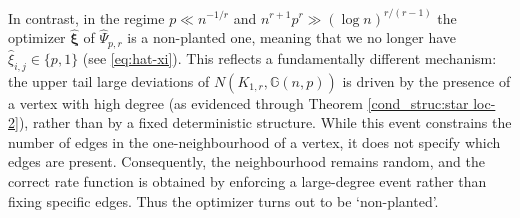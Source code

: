\documentclass[a4paper,11pt,english,reqno]{amsart}
\numberwithin{equation}{section}
\newcommand{\uH}{\textup{H}}
\newcommand{\G}{\mathbb{G}}
\newcommand{\set}[1]{[\![#1]\!]}
\newcommand{\blue}[1]{{\color{blue} #1}}
\begin{document}
In contrast, in the regime $p \ll n^{-1/r}$ and $n^{r+1}p^r \gg (\log n)^{r/(r-1)}$ the optimizer $\widehat {\bm \xi}$ of $\widehat \Psi_{p,r}$ is a non-planted one, meaning that we no longer have $\widehat \xi_{i,j} \in \{p,1\}$ (see \eqref{eq:hat-xi}). This reflects a fundamentally different mechanism: the upper tail large deviations of $N(K_{1,r},\G(n,p))$ is driven by the presence of a vertex with high degree (as evidenced through Theorem \ref{cond_struc:star loc-2}), rather than by a fixed deterministic structure. While this event constrains the number of edges in the one-neighbourhood of a vertex, it does not specify which edges are present. Consequently, the neighbourhood remains random, and the correct rate function is obtained by enforcing a large-degree event rather than fixing specific edges. Thus the optimizer turns out to be `non-planted'.

%	
%	
	
	
	
	
	
	
\end{document}
